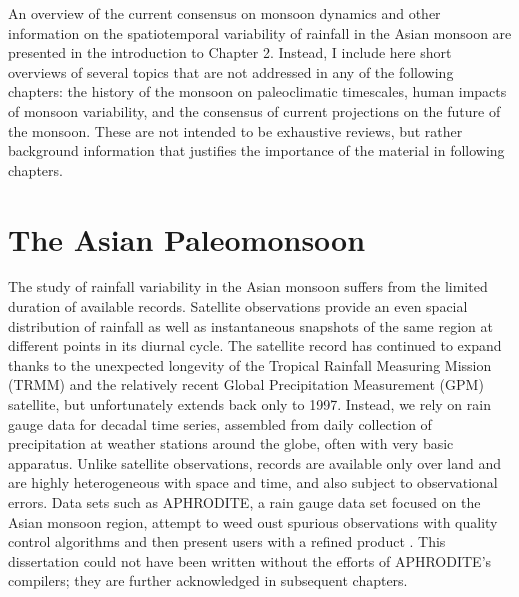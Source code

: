 	An overview of the current consensus on monsoon dynamics and other information on the spatiotemporal variability of rainfall in the Asian monsoon are presented in the introduction to Chapter 2. Instead, I include here short overviews of several topics that are not addressed in any of the following chapters: the history of the monsoon on paleoclimatic timescales, human impacts of monsoon variability, and the consensus of current projections on the future of the monsoon. These are not intended to be exhaustive reviews, but rather background information that justifies the importance of the material in following chapters.
	
\section{The Asian Paleomonsoon}

	The study of rainfall variability in the Asian monsoon suffers from the limited duration of available records. Satellite observations provide an even spacial distribution of rainfall as well as instantaneous snapshots of the same region at different points in its diurnal cycle. The satellite record has continued to expand thanks to the unexpected longevity of the Tropical Rainfall Measuring Mission (TRMM) and the relatively recent Global Precipitation Measurement (GPM) satellite, but unfortunately extends back only to 1997. Instead, we rely on rain gauge data for decadal time series, assembled from daily collection of precipitation at weather stations around the globe, often with very basic apparatus. Unlike satellite observations, records are available only over land and are highly heterogeneous with space and time, and also subject to observational errors. Data sets such as APHRODITE, a rain gauge data set focused on the Asian monsoon region, attempt to weed oust spurious observations with quality control algorithms and then present users with a refined product \citep{Yatagai2012}. This dissertation could not have been written without the efforts of APHRODITE's compilers; they are further acknowledged in subsequent chapters.
	
